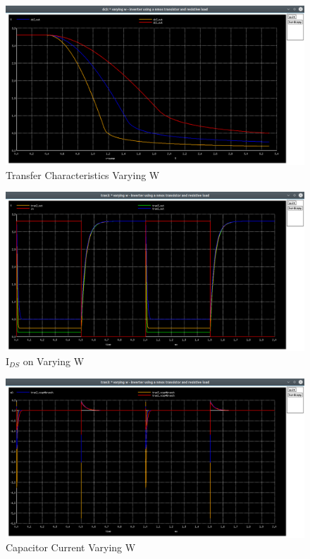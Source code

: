 \documentclass[12pt, a4paper]{article}
\begin{document}
	\begin{figure}[H]
		\begin{center}
			\includegraphics[scale=0.25]{images/inverter_w_dc.png}
			\caption{Transfer Characteristics Varying W}
			\label{fig::varying_w_dc}
		\end{center}
	\end{figure}
	\begin{figure}[H]
		\begin{center}
			\includegraphics[scale=0.25]{images/inverter_w_tran.png}
			\caption{$\text{I}_{DS}$ on Varying W}
			\label{fig::varying_w_time}
		\end{center}
	\end{figure}
	
	\begin{figure}[H]
		\begin{center}
			\includegraphics[scale=0.25]{images/inverter_w_vcap.png}
			\caption{Capacitor Current Varying W}
			\label{fig::varying_w_vcap}
		\end{center}
	\end{figure}
	
\end{document}

